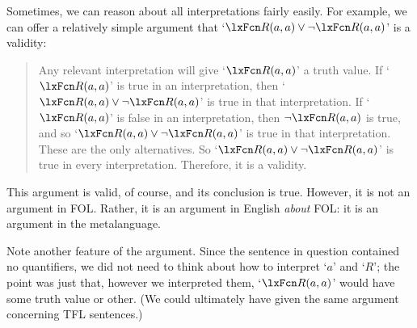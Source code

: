 Sometimes, we can reason about all interpretations fairly easily. For example, we can offer a relatively simple argument that `$\atom{R}{a,a}\eor\enot \atom{R}{a,a}$' is a validity:
	\begin{quote}
		\label{allmodels1}
		Any relevant interpretation will give `$\atom{R}{a,a}$' a truth value. If `$\atom{R}{a,a}$' is true in an interpretation, then `$\atom{R}{a,a} \eor \enot\atom{R}{a,a}$' is true in that interpretation. If `$\atom{R}{a,a}$' is false in an interpretation, then $\enot\atom{R}{a,a}$ is true, and so `$\atom{R}{a,a} \eor\enot \atom{R}{a,a}$' is true in that interpretation. These are the only alternatives. So `$\atom{R}{a,a} \eor\enot \atom{R}{a,a}$' is true in every interpretation. Therefore, it is a validity.
	\end{quote}
This argument is valid, of course, and its conclusion is true. However, it is not an argument in FOL. Rather, it is an argument in English \emph{about} FOL: it is an argument in the metalanguage.

Note another feature of the argument. Since the sentence in question contained no quantifiers, we did not need to think about how to interpret `$a$' and `$R$'; the point was just that, however we interpreted them, `$\atom{R}{a,a}$' would have some truth value or other. (We could ultimately have given the same argument concerning TFL sentences.)


